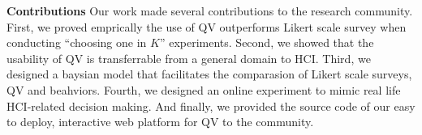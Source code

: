 \textbf{Contributions}
Our work made several contributions to the research community. 
First, we proved emprically 
the use of QV outperforms Likert scale survey
when conducting ``choosing one in $K$'' experiments.
Second, we showed that the usability of QV
is transferrable from a general domain to HCI.
Third, we designed a baysian model 
that facilitates the comparasion
of Likert scale surveys, QV and beahviors.
Fourth, we designed an online experiment
to mimic real life HCI-related decision making.
And finally, we provided the source code of our easy to deploy, 
interactive web platform for QV to the community.